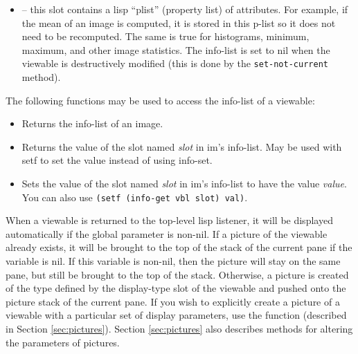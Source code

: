 \begin{itemize}
\item {} -- this slot contains a lisp ``plist'' (property
list) of attributes.  For example, if the mean of an image is
computed, it is stored in this p-list so it does not need to be
recomputed.  The same is true for histograms, minimum, maximum, and
other image statistics.  The info-list is set to nil when the viewable
is destructively modified (this is done by the {\tt set-not-current} method).
\end{itemize}

The following functions may be used to access the info-list of a viewable:
\begin{itemize}
\item{}
Returns the info-list of an image.

\item{}
Returns the value of the slot named {\em slot} in im's info-list.  May be
used with setf to set the value instead of using info-set.

\item{}
Sets the value of the slot named {\em slot} in im's info-list to have
the value {\em value}.  You can also use {\tt (setf (info-get vbl
slot) val)}.

\end{itemize}


When a viewable is returned to the top-level lisp listener, it will be
displayed automatically if the global parameter
 is non-nil.  If a picture 
 of the viewable
already exists, it will be brought to the top of the stack of the
current pane  if the variable
 is nil.  If this variable is non-nil,
then the picture will stay on the same pane, but still be brought to
the top of the stack.  Otherwise, a picture is created of the type
defined by the display-type slot of the viewable and pushed onto the
picture stack of the current pane.  If you wish to explicitly create a
picture of a viewable with a particular set of display parameters, use
the
 function (described in Section \ref{sec:pictures}).
Section \ref{sec:pictures} also describes methods for altering the
parameters of pictures.


